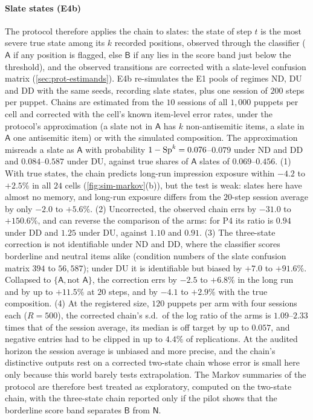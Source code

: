 \paragraph{Slate states (E4b)} The protocol therefore applies the chain to slates: the state of step $t$ is the most severe true state among its $k$ recorded positions, observed through the classifier ($\mathsf A$ if any position is flagged, else $\mathsf B$ if any lies in the score band just below the threshold), and the observed transitions are corrected with a slate-level confusion matrix (\cref{sec:prot-estimands}). E4b re-simulates the E1 pools of regimes ND, DU and DD with the same seeds, recording slate states, plus one session of $200$ steps per puppet. Chains are estimated from the $10$ sessions of all $1{,}000$ puppets per cell and corrected with the cell's known item-level error rates, under the protocol's approximation (a slate not in $\mathsf A$ has $k$ non-antisemitic items, a slate in $\mathsf A$ one antisemitic item) or with the simulated composition. The approximation misreads a slate as $\mathsf A$ with probability $1-\mathrm{Sp}^k=0.076$--$0.079$ under ND and DD and $0.084$--$0.587$ under DU, against true shares of $\mathsf A$ slates of $0.069$--$0.456$. (1) With true states, the chain predicts long-run impression exposure within $-4.2$ to $+2.5\%$ in all $24$ cells (\cref{fig:sim-markov}(b)), but the test is weak: slates here have almost no memory, and long-run exposure differs from the $20$-step session average by only $-2.0$ to $+5.6\%$. (2) Uncorrected, the observed chain errs by $-31.0$ to $+150.6\%$, and can reverse the comparison of the arms: for P4 its ratio is $0.94$ under DD and $1.25$ under DU, against $1.10$ and $0.91$. (3) The three-state correction is not identifiable under ND and DD, where the classifier scores borderline and neutral items alike (condition numbers of the slate confusion matrix $394$ to $56{,}587$); under DU it is identifiable but biased by $+7.0$ to $+91.6\%$. Collapsed to $\{\mathsf A,\text{not }\mathsf A\}$, the correction errs by $-2.5$ to $+6.8\%$ in the long run and by up to $+11.5\%$ at $20$ steps, and by $-4.1$ to $+2.9\%$ with the true composition. (4) At the registered size, $120$ puppets per arm with four sessions each ($R=500$), the corrected chain's s.d.\ of the log ratio of the arms is $1.09$--$2.33$ times that of the session average, its median is off target by up to $0.057$, and negative entries had to be clipped in up to $4.4\%$ of replications. At the audited horizon the session average is unbiased and more precise, and the chain's distinctive outputs rest on a corrected two-state chain whose error is small here only because this world barely tests extrapolation. The Markov summaries of the protocol are therefore best treated as exploratory, computed on the two-state chain, with the three-state chain reported only if the pilot shows that the borderline score band separates $\mathsf B$ from $\mathsf N$.

